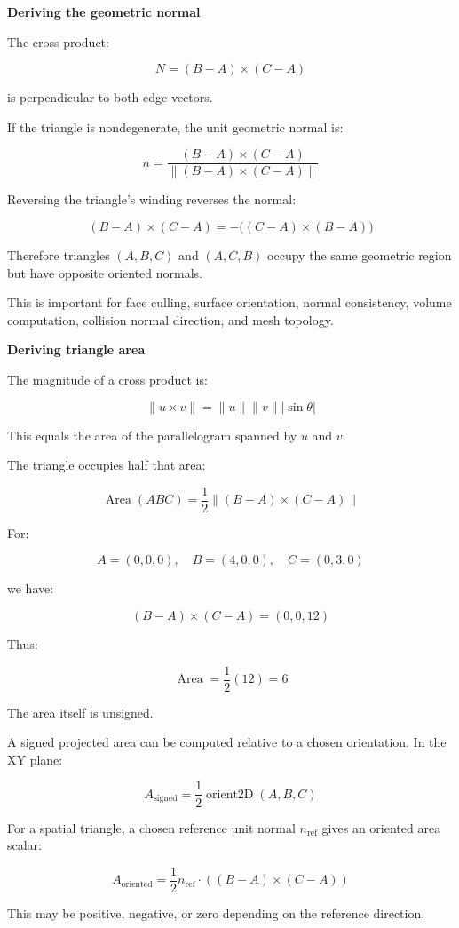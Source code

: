\textbf{Deriving the geometric normal}

The cross product:

\[
N=(B-A)\times(C-A)
\]

is perpendicular to both edge vectors.

If the triangle is nondegenerate, the unit geometric normal is:

\[
\boxed{ n=\frac{(B-A)\times(C-A)} {\|(B-A)\times(C-A)\|} }
\]

Reversing the triangle's winding reverses the normal:

\[
(B-A)\times(C-A) = -\big((C-A)\times(B-A)\big)
\]

Therefore triangles \((A,B,C)\) and \((A,C,B)\) occupy the same geometric region but have opposite oriented normals.

This is important for face culling, surface orientation, normal consistency, volume computation, collision normal direction, and mesh topology.

\textbf{Deriving triangle area}

The magnitude of a cross product is:

\[
\|u\times v\|=\|u\|\|v\||\sin\theta|
\]

This equals the area of the parallelogram spanned by \(u\) and \(v\).

The triangle occupies half that area:

\[
\boxed{ \operatorname{Area}(ABC)= \frac12\|(B-A)\times(C-A)\| }
\]

For:

\[
A=(0,0,0),\quad B=(4,0,0),\quad C=(0,3,0)
\]

we have:

\[
(B-A)\times(C-A)=(0,0,12)
\]

Thus:

\[
\operatorname{Area}=\frac12(12)=6
\]

The area itself is unsigned.

A signed projected area can be computed relative to a chosen orientation. In the XY plane:

\[
A_{\mathrm{signed}}= \frac12\operatorname{orient2D}(A,B,C)
\]

For a spatial triangle, a chosen reference unit normal \(n_{\mathrm{ref}}\) gives an oriented area scalar:

\[
A_{\mathrm{oriented}}= \frac12n_{\mathrm{ref}}\cdot ((B-A)\times(C-A))
\]

This may be positive, negative, or zero depending on the reference direction.

